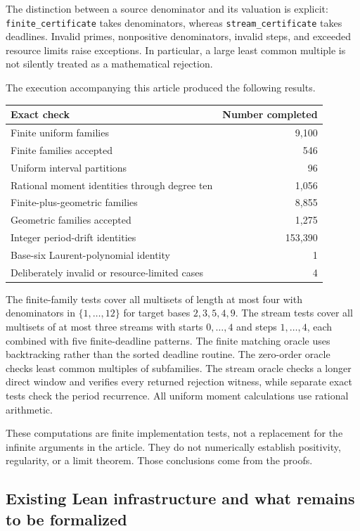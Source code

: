 \documentclass[11pt,a4paper]{article}
\theoremstyle{remark}
\newcommand{\pathtext}[1]{\nolinkurl{#1}}
\begin{document}
The distinction between a source denominator and its valuation is explicit:
\pathtext{finite_certificate} takes denominators, whereas
\pathtext{stream_certificate} takes deadlines. Invalid primes, nonpositive
denominators, invalid steps, and exceeded resource limits raise exceptions.
In particular, a large least common multiple is not silently treated as a
mathematical rejection.

The execution accompanying this article produced the following results.
\begin{center}
\begin{tabular}{@{}lr@{}}
\toprule
Exact check & Number completed \\
\midrule
Finite uniform families & 9,100 \\
Finite families accepted & 546 \\
Uniform interval partitions & 96 \\
Rational moment identities through degree ten & 1,056 \\
Finite-plus-geometric families & 8,855 \\
Geometric families accepted & 1,275 \\
Integer period-drift identities & 153,390 \\
Base-six Laurent-polynomial identity & 1 \\
Deliberately invalid or resource-limited cases & 4 \\
\bottomrule
\end{tabular}
\end{center}

The finite-family tests cover all multisets of length at most four with
denominators in $\{1,\ldots,12\}$ for target bases $2,3,5,4,9$.
The stream tests cover all multisets of at most three streams with starts
$0,\ldots,4$ and steps $1,\ldots,4$, each combined with five finite-deadline
patterns. The finite matching oracle uses backtracking rather than the sorted
deadline routine. The zero-order oracle checks least common multiples of
subfamilies. The stream oracle checks a longer direct window and verifies every
returned rejection witness, while separate exact tests check the period recurrence.
All uniform moment calculations use rational arithmetic.

These computations are finite implementation tests, not a replacement for the
infinite arguments in the article. They do not numerically establish positivity,
regularity, or a limit theorem. Those conclusions come from the proofs.

\subsection{Existing Lean infrastructure and what remains to be formalized}
\end{document}

